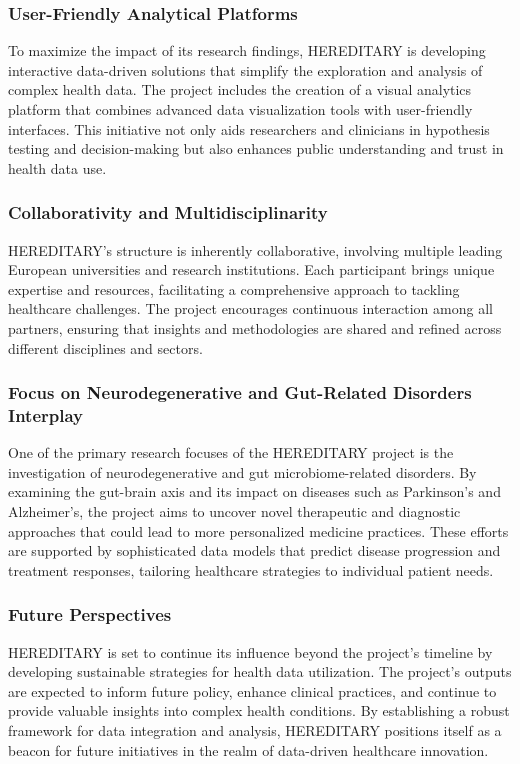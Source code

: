 \subsubsection{User-Friendly Analytical Platforms}
To maximize the impact of its research findings, \ac{HEREDITARY} is developing interactive data-driven solutions that simplify the exploration and analysis of complex health data. The project includes the creation of a visual analytics platform that combines advanced data visualization tools with user-friendly interfaces. This initiative not only aids researchers and clinicians in hypothesis testing and decision-making but also enhances public understanding and trust in health data use.
\subsubsection{Collaborativity and Multidisciplinarity}
\ac{HEREDITARY}'s structure is inherently collaborative, involving multiple leading European universities and research institutions. Each participant brings unique expertise and resources, facilitating a comprehensive approach to tackling healthcare challenges. The project encourages continuous interaction among all partners, ensuring that insights and methodologies are shared and refined across different disciplines and sectors.
\subsubsection{Focus on Neurodegenerative and Gut-Related Disorders Interplay}
One of the primary research focuses of the \ac{HEREDITARY} project is the investigation of neurodegenerative and gut microbiome-related disorders. By examining the gut-brain axis and its impact on diseases such as Parkinson's and Alzheimer's, the project aims to uncover novel therapeutic and diagnostic approaches that could lead to more personalized medicine practices. These efforts are supported by sophisticated data models that predict disease progression and treatment responses, tailoring healthcare strategies to individual patient needs.
\subsubsection{Future Perspectives}
\ac{HEREDITARY} is set to continue its influence beyond the project's timeline by developing sustainable strategies for health data utilization. The project's outputs are expected to inform future policy, enhance clinical practices, and continue to provide valuable insights into complex health conditions. By establishing a robust framework for data integration and analysis, \ac{HEREDITARY} positions itself as a beacon for future initiatives in the realm of data-driven healthcare innovation.
